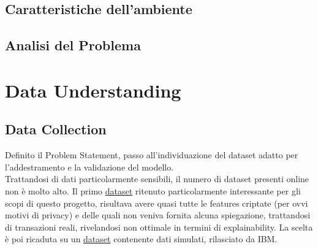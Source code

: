 \documentclass[]{article}
\begin{document}
    \subsection{Caratteristiche dell'ambiente}

    \subsection{Analisi del Problema}

\section{Data Understanding}
    \subsection{Data Collection}
        Definito il Problem Statement, passo all'individuazione del dataset adatto per l'addestramento e la validazione del modello.\\
        Trattandosi di dati particolarmente sensibili, il numero di dataset presenti online non è molto alto. Il primo \href{https://www.kaggle.com/datasets/mlg-ulb/creditcardfraud}{dataset} ritenuto particolarmente interessante per gli scopi di questo progetto, risultava avere quasi tutte le features criptate (per ovvi motivi di privacy) e delle quali non veniva fornita alcuna spiegazione, trattandosi di transazioni reali, rivelandosi non ottimale in termini di explainability.
        La scelta è poi ricaduta su un \href{https://www.kaggle.com/datasets/ealtman2019/credit-card-transactions/data}{dataset} contenente dati simulati, rilasciato da IBM.
\end{document}
